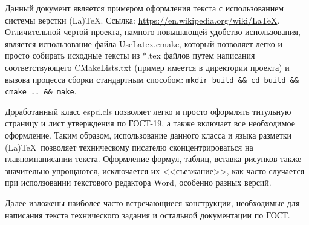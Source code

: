 \newpage\annotation

Данный документ является примером оформления текста с использованием системы верстки (La)\TeX. Ссылка: \url{https://en.wikipedia.org/wiki/LaTeX}. Отличительной чертой проекта, намного повышающей удобство использования, является использование файла UseLatex.cmake, который позволяет легко и просто собирать исходные тексты из *.tex файлов путем написания соответствующего CMakeLists.txt (пример имеется в директории проекта) и вызова процесса сборки стандартным способом: \lstinline|mkdir build && cd build && cmake .. && make|.

Доработанный класс espd.cls позволяет легко и просто оформлять титульную страницу и лист утверждения по ГОСТ-19, а также включает все необходимое оформление. Таким образом, использование данного класса и языка разметки (La)\TeX~позволяет техническому писателю сконцентрироваться на главном\mdash написании текста. Оформление формул, таблиц, вставка рисунков также значительно упрощаются, исключается их <<съезжание>>, как часто случается при исползовании текстового редактора Word, особенно разных версий.

Далее изложены наиболее часто встречающиеся конструкции, необходимые для написания текста технического задания и остальной документации по ГОСТ.
